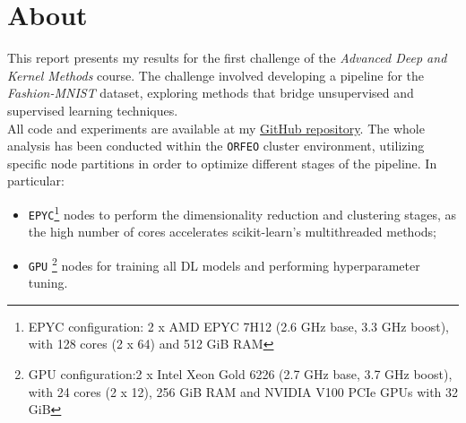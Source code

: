 \section{About
}\label{intro}
This report presents my results for the first challenge of the \emph{Advanced Deep and Kernel Methods} course. The challenge
involved developing a pipeline for the \emph{Fashion-MNIST} dataset, exploring methods that bridge
unsupervised and supervised learning techniques.\\[0.2cm]
All code and experiments are available at my \href{https://github.com/giuliofantuzzi/AdvancedDeep-KernelMethods/}{GitHub repository}. The whole analysis has been conducted within the \texttt{ORFEO} cluster environment,
utilizing specific node partitions in order to optimize different stages of the pipeline. In particular:
\begin{itemize}
    \item \texttt{EPYC}\footnote{\footnotesize EPYC configuration: 2 x AMD EPYC 7H12 (2.6 GHz base, 3.3 GHz boost), with 128 cores (2 x 64) and 512 GiB RAM}
nodes to perform the dimensionality reduction and clustering stages, as the high number of cores accelerates scikit-learn’s multithreaded methods;
    \item \texttt{GPU} \footnote{\footnotesize GPU configuration:2 x Intel Xeon Gold 6226 (2.7 GHz base, 3.7 GHz boost), with 24 cores (2 x 12), 256 GiB RAM and NVIDIA V100 PCIe GPUs with 32 GiB}
nodes for training all DL models and performing hyperparameter tuning.
\end{itemize}